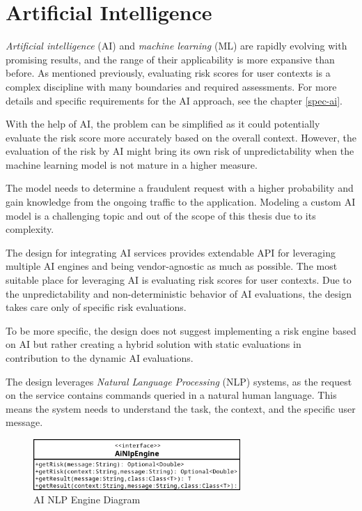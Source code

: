 \newpage
\section{Artificial Intelligence} \label{design-ai}
\textit{Artificial intelligence} (AI) and \textit{machine learning} (ML) are rapidly evolving with promising results, and the range of their applicability is more expansive than before.
As mentioned previously, evaluating risk scores for user contexts is a complex discipline with many boundaries and required assessments.
For more details and specific requirements for the AI approach, see the chapter \ref{spec-ai}.

With the help of AI, the problem can be simplified as it could potentially evaluate the risk score more accurately based on the overall context.
However, the evaluation of the risk by AI might bring its own risk of unpredictability when the machine learning model is not mature in a higher measure.

The model needs to determine a fraudulent request with a higher probability and gain knowledge from the ongoing traffic to the application.
Modeling a custom AI model is a challenging topic and out of the scope of this thesis due to its complexity.

The design for integrating AI services provides extendable API for leveraging multiple AI engines and being vendor-agnostic as much as possible.
The most suitable place for leveraging AI is evaluating risk scores for user contexts. 
Due to the unpredictability and non-deterministic behavior of AI evaluations, the design takes care only of specific risk evaluations.

To be more specific, the design does not suggest implementing a risk engine based on AI but rather creating a hybrid solution with static evaluations in contribution to the dynamic AI evaluations.

The design leverages \textit{Natural Language Processing} (NLP) systems, as the request on the service contains commands queried in a natural human language.
This means the system needs to understand the task, the context, and the specific user message.  

\begin{figure}[htbp]
  \centering
  \includegraphics[width=0.7\textwidth]{img/sections/5-design/ai-engine.png}
  \caption{AI NLP Engine Diagram}
  \label{fig:ai-engine-diagram}
\end{figure}

